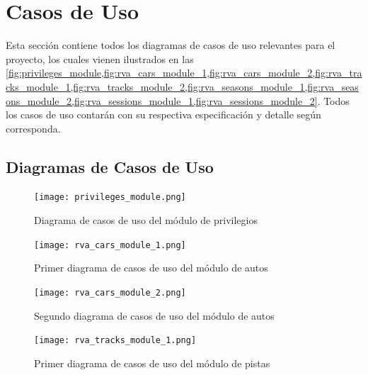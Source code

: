 \newpage

\section{Casos de Uso}
Esta sección contiene todos los diagramas de casos de uso relevantes para el proyecto, los cuales vienen ilustrados en las \cref{fig:privileges_module,fig:rva_cars_module_1,fig:rva_cars_module_2,fig:rva_tracks_module_1,fig:rva_tracks_module_2,fig:rva_seasons_module_1,fig:rva_seasons_module_2,fig:rva_sessions_module_1,fig:rva_sessions_module_2}. Todos los casos de uso contarán con su respectiva especificación y detalle según corresponda.

\subsection{Diagramas de Casos de Uso}
\label{analysis:usecases}

\begin{figure}[H]
  \begin{center}
    \texttt{[image: privileges\_module.png]}
  \end{center}
  \caption[Diagrama de casos de uso del módulo de privilegios]{Diagrama de  casos de uso del módulo de privilegios}
  \label{fig:privileges_module}
\end{figure}

\begin{figure}[H]
  \begin{center}
    \texttt{[image: rva\_cars\_module\_1.png]}
  \end{center}
  \caption[Primer diagrama de casos de uso  del módulo de autos]{Primer diagrama de casos de uso del módulo de autos}
  \label{fig:rva_cars_module_1}
\end{figure}

\begin{figure}[H]
  \begin{center}
    \texttt{[image: rva\_cars\_module\_2.png]}
  \end{center}
  \caption[Segundo diagrama de casos de uso del módulo de autos]{Segundo diagrama de casos de uso del módulo de autos}
  \label{fig:rva_cars_module_2}
\end{figure}

\begin{figure}[H]
  \begin{center}
    \texttt{[image: rva\_tracks\_module\_1.png]}
  \end{center}
  \caption[Primer diagrama de casos de uso del módulo de pistas]{Primer diagrama de casos de uso del módulo de pistas}
  \label{fig:rva_tracks_module_1}
\end{figure}

